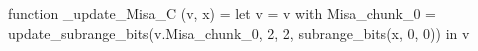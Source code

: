 function _update_Misa_C (v, x) = let v = { v with Misa_chunk_0 = update_subrange_bits(v.Misa_chunk_0, 2, 2, subrange_bits(x, 0, 0)) } in
  v
